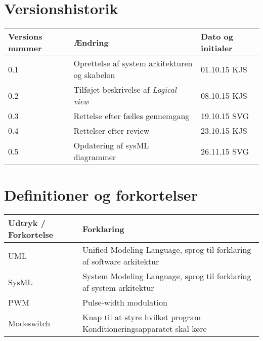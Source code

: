 	\section{Versionshistorik}
	\begin{longtable}{ |p{} |p{}| p{}|  } 
		\hline
		\rowcolor{usDef}
		\textbf{Versions nummer} &  \textbf{Ændring} & \textbf{Dato og initialer} \\
		\hline
		0.1 &  Oprettelse af system arkitekturen og skabelon & 01.10.15 KJS \\
		\hline
		0.2 & Tilføjet beskrivelse af \textit{Logical view} & 08.10.15 KJS \\
		\hline
		0.3 & Rettelse efter fælles gennemgang & 19.10.15 SVG \\
		\hline
		0.4 & Rettelser efter review & 23.10.15 KJS \\
		\hline
		0.5 & Opdatering af sysML diagrammer  & 26.11.15 SVG \\
		\hline
	\end{longtable}

	\section{Definitioner og forkortelser}
	\begin{longtable}{ |p{} |p{}| } 
		\hline
		\textbf{Udtryk / Forkortelse} &  \textbf{Forklaring} \\
		\hline
		UML & Unified Modeling Language, sprog til forklaring af software arkitektur \\
		\hline
		SysML & System Modeling Language, sprog til forklaring af system arkitektur \\
		\hline
		PWM & Pulse-width modulation \\
		\hline
		Modeswitch & Knap til at styre hvilket program Konditioneringsapparatet skal køre \\
		\hline
	\end{longtable}